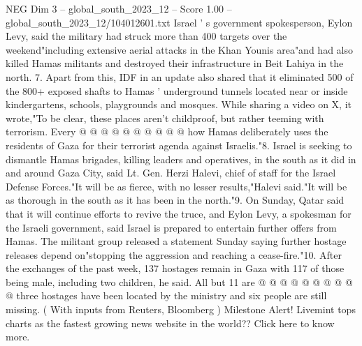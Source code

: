 \begin{textsample}{NEG Dim 3 – global\_south\_2023\_12 – Score 1.00 – global\_south\_2023\_12/104012601.txt}
Israel ' s government spokesperson, Eylon Levy, said the military had struck more than 400 targets over the weekend"including extensive aerial attacks in the Khan Younis area"and had also killed Hamas militants and destroyed their infrastructure in Beit Lahiya in the north. 7.
Apart from this, IDF in an update also shared that it eliminated 500 of the 800+ exposed shafts to Hamas ' underground tunnels located near or inside kindergartens, schools, playgrounds and mosques.
While sharing a video on X, it wrote,"To be clear, these places aren't childproof, but rather teeming with terrorism.
Every @ @ @ @ @ @ @ @ @ @ how Hamas deliberately uses the residents of Gaza for their terrorist agenda against Israelis."8.
Israel is seeking to dismantle Hamas brigades, killing leaders and operatives, in the south as it did in and around Gaza City, said Lt.
Gen.
Herzi Halevi, chief of staff for the Israel Defense Forces."It will be as fierce, with no lesser results,"Halevi said."It will be as thorough in the south as it has been in the north."9.
On Sunday, Qatar said that it will continue efforts to revive the truce, and Eylon Levy, a spokesman for the Israeli government, said Israel is prepared to entertain further offers from Hamas.
The militant group released a statement Sunday saying further hostage releases depend on"stopping the aggression and reaching a cease-fire."10.
After the exchanges of the past week, 137 hostages remain in Gaza with 117 of those being male, including two children, he said.
All but 11 are @ @ @ @ @ @ @ @ @ @ three hostages have been located by the ministry and six people are still missing. ( With inputs from Reuters, Bloomberg ) Milestone Alert!
Livemint tops charts as the fastest growing news website in the world??
Click here to know more.

\end{textsample}
